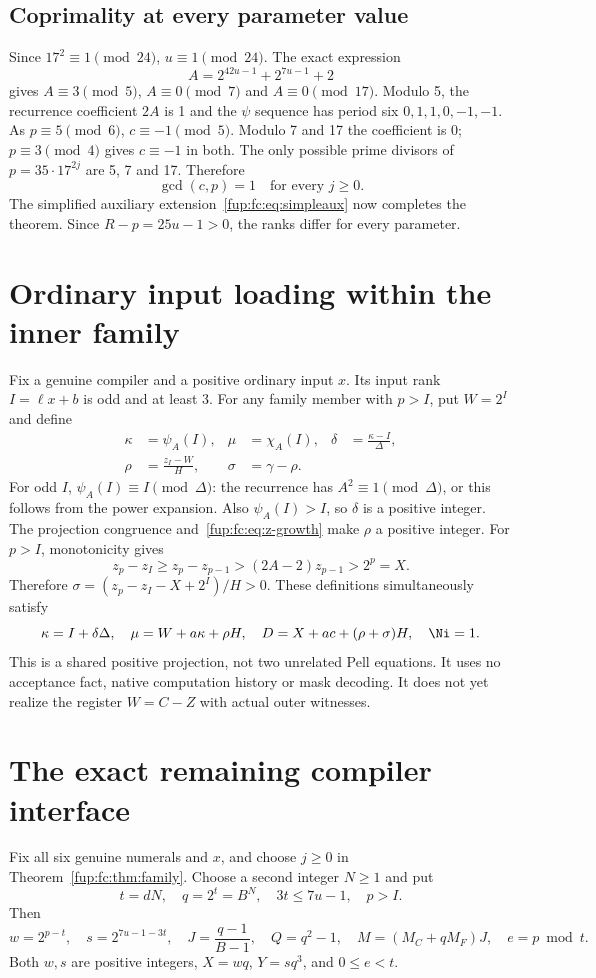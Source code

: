 \documentclass[11pt,letterpaper]{article}
\theoremstyle{definition}\newtheorem{definition}[theorem]{Definition}
\theoremstyle{remark}\newtheorem{remark}[theorem]{Remark}
\newcommand{\D}{\Delta}
\newcommand{\ch}[2]{\chi_{#1}(#2)}\newcommand{\ps}[2]{\psi_{#1}(#2)}
\begin{document}
\subsection{Coprimality at every parameter value}
Since $17^2\equiv1\pmod{24}$, $u\equiv1\pmod{24}$.
The exact expression
\[
 A=2^{42u-1}+2^{7u-1}+2
\]
gives $A\equiv3\pmod5$, $A\equiv0\pmod7$ and $A\equiv0\pmod{17}$.
Modulo 5, the recurrence coefficient $2A$ is 1 and the $\psi$ sequence
has period six $0,1,1,0,-1,-1$. As $p\equiv5\pmod6$, $c\equiv-1\pmod5$.
Modulo 7 and 17 the coefficient is 0; $p\equiv3\pmod4$ gives
$c\equiv-1$ in both. The only possible prime divisors of $p=35\cdot17^{2j}$
are 5, 7 and 17. Therefore
\begin{equation}
 \gcd(c,p)=1\quad\text{for every }j\ge0.\label{fup:fc:eq:coprime}
\end{equation}
The simplified auxiliary extension~\eqref{fup:fc:eq:simpleaux} now completes
the theorem. Since $R-p=25u-1>0$, the ranks differ for every parameter.

\section{Ordinary input loading within the inner family}
\label{fup:fc:sec:loader}
Fix a genuine compiler and a positive ordinary input $x$. Its input
rank $I=\ell x+b$ is odd and at least 3. For any family member with
$p>I$, put $W=2^I$ and define
\begin{align}
 \kappa&=\ps A I,&\mu&=\ch A I,&
 \delta&=\frac{\kappa-I}{\D},\label{fup:fc:eq:delta}\\
 \rho&=\frac{z_I-W}{H},&\sigma&=\gamma-\rho.
 \label{fup:fc:eq:loader}
\end{align}
For odd $I$, $\ps A I\equiv I\pmod\D$: the recurrence has
$A^2\equiv1\pmod\D$, or this follows from the power expansion.
Also $\ps A I>I$, so $\delta$ is a positive integer.
The projection congruence and~\eqref{fup:fc:eq:z-growth} make $\rho$ a positive
integer. For $p>I$, monotonicity gives
\[
 z_p-z_I\ge z_p-z_{p-1}>(2A-2)z_{p-1}>2^p=X.
\]
Therefore
$\sigma=(z_p-z_I-X+2^I)/H>0$.
These definitions simultaneously satisfy
\[
 \kappa=I+\delta\D,\quad\mu=W+a\kappa+\rho H,
 \quad D=X+ac+(\rho+\sigma)H,
 \quad\Ni=1.
\]
This is a shared positive projection, not two unrelated Pell equations.
It uses no acceptance fact, native computation history or mask decoding.
It does not yet realize the register $W=C-Z$ with actual outer witnesses.

\section{The exact remaining compiler interface}
\label{fup:fc:sec:interface}
Fix all six genuine numerals and $x$, and choose $j\ge0$ in
Theorem~\ref{fup:fc:thm:family}. Choose a second integer $N\ge1$ and put
\begin{equation}
 t=dN,\quad q=2^t=B^N,\quad
 3t\le7u-1,\quad p>I.\label{fup:fc:eq:scalerestrictions}
\end{equation}
Then
\[
 w=2^{p-t},\quad s=2^{7u-1-3t},\quad
 J=\frac{q-1}{B-1},\quad Q=q^2-1,\quad
 M=(M_C+qM_F)J,\quad e=p\bmod t.
\]
Both $w,s$ are positive integers, $X=wq$, $Y=sq^3$, and $0\le e<t$.
\end{document}
